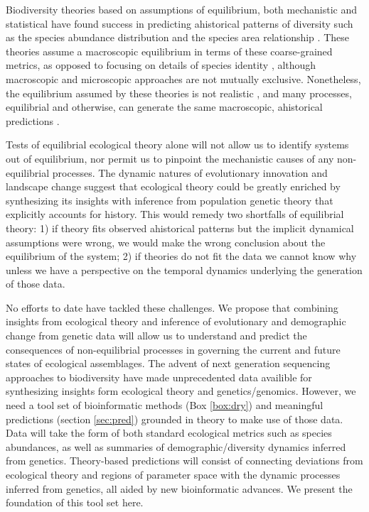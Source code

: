 \documentclass[12pt]{article}
\newcounter{Box}
\begin{document}
Biodiversity theories based on assumptions of equilibrium, both
mechanistic \citep{hubbell2001, chesson2000, tilman2004} and
statistical \citep[see the Glossary;][]{harte2011, pueyo2007}
have found success in predicting ahistorical patterns of diversity
such as the species abundance distribution \citep{white2012,
  hubbell2001, harte2011} and the species area relationship
\citep{hubbell2001, harte2011}. These theories assume a
macroscopic equilibrium in terms of these coarse-grained metrics, as
opposed to focusing on details of species identity \citep[such as
in][]{blonder2015}, although macroscopic and microscopic approaches
are not mutually exclusive.  Nonetheless, the equilibrium assumed by
these theories is not realistic \citep{ricklefs2006}, and many
processes, equilibrial and otherwise, can generate the same
macroscopic, ahistorical predictions \citep{mcgill2007}.

Tests of equilibrial ecological theory alone will not allow us to
identify systems out of equilibrium, nor permit us to pinpoint the
mechanistic causes of any non-equilibrial processes. The dynamic
natures of evolutionary innovation and landscape change suggest that
ecological theory could be greatly enriched by synthesizing its
insights with inference from population genetic theory that explicitly
accounts for history. This would remedy two shortfalls of equilibrial
theory: 1) if theory fits observed ahistorical patterns but the
implicit dynamical assumptions were wrong, we would make the wrong
conclusion about the equilibrium of the system; 2) if theories do not
fit the data we cannot know why unless we have a perspective on the
temporal dynamics underlying the generation of those data.

No efforts to date have tackled these challenges. We propose that
combining insights from ecological theory and inference of
evolutionary and demographic change from genetic data will allow us to
understand and predict the consequences of non-equilibrial processes
in governing the current and future states of ecological
assemblages. The advent of next generation sequencing approaches to
biodiversity\citep{taberlet2012, gibson2014, shokralla2015, ji2013,
  zhou2013, bohmann2014, linard2015, leray2015, dodsworth2015,
  liu2016} have made unprecedented data availible for synthesizing
insights form ecological theory and genetics/genomics.  However, we
need a tool set of bioinformatic methods (Box \ref{box:dry}) and
meaningful predictions (section \ref{sec:pred}) grounded in theory to
make use of those data. Data will take the form of both standard
ecological metrics such as species abundances, as well as summaries of
demographic/diversity dynamics inferred from genetics. Theory-based
predictions will consist of connecting deviations from ecological
theory and regions of parameter space with the dynamic processes
inferred from genetics, all aided by new bioinformatic advances. We
present the foundation of this tool set here.
\end{document}
